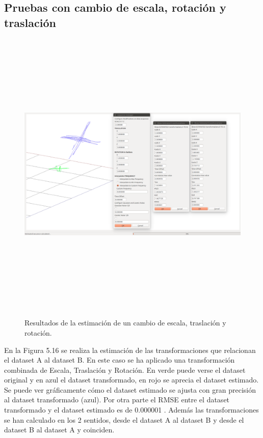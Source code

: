 \subsection{Pruebas con cambio de escala, rotación y traslación}
\begin{figure}[H]
\begin{center}
\label{fig:opciones de View}\includegraphics[height=14.0cm,width=18.0cm]{img/cap6/Escala_Trasla_Rota_abba.png}
\hspace{0.5cm}

\end{center}

\caption{Resultados de la estimación de un cambio de escala, traslación y rotación.}
\end{figure}

En la Figura 5.16 se realiza la estimación de las transformaciones que relacionan el dataset A al dataset B. En este caso se ha aplicado una transformación combinada de Escala, Traslación y Rotación. En verde puede verse el dataset original y en azul el dataset transformado, en rojo se aprecia el dataset estimado.
Se puede ver gráficamente cómo el dataset estimado se ajusta con gran precisión al dataset transformado (azul).
Por otra parte el RMSE entre el dataset transformado y el dataset estimado es de 0.000001
. Además las transformaciones se han calculado en los 2 sentidos, desde el dataset A  al dataset B y desde el dataset B al dataset A y coinciden.

